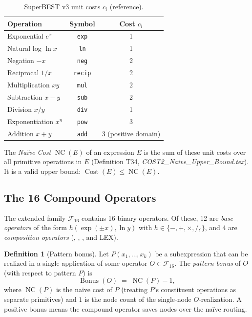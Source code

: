 \documentclass[12pt,a4paper]{article}
\theoremstyle{definition}
\newtheorem{definition}[theorem]{Definition}
\newcommand{\ELAd}{\operatorname{ELAd}}
\newcommand{\ELSb}{\operatorname{ELSb}}
\newcommand{\LEAd}{\operatorname{LEAd}}
\newcommand{\NC}{\operatorname{NC}}
\newcommand{\Cost}{\operatorname{Cost}}
\newcommand{\Bonus}{\operatorname{Bonus}}
\begin{document}
\begin{table}[h]
\centering
\caption{SuperBEST v3 unit costs $c_i$ (reference).}
\label{tab:unit-costs}
\smallskip
\begin{tabular}{@{}lcc@{}}
\toprule
\textbf{Operation} & \textbf{Symbol} & \textbf{Cost $c_i$} \\
\midrule
Exponential  $e^x$   & \texttt{exp} & 1 \\
Natural log  $\ln x$ & \texttt{ln}  & 1 \\
Negation     $-x$    & \texttt{neg} & 2 \\
Reciprocal   $1/x$   & \texttt{recip} & 2 \\
Multiplication $xy$  & \texttt{mul} & 2 \\
Subtraction  $x-y$   & \texttt{sub} & 2 \\
Division     $x/y$   & \texttt{div} & 1 \\
Exponentiation $x^n$ & \texttt{pow} & 3 \\
Addition     $x+y$   & \texttt{add} & 3 (positive domain) \\
\bottomrule
\end{tabular}
\end{table}

The \emph{Na\"{i}ve Cost} $\NC(E)$ of an expression $E$ is the sum of these
unit costs over all primitive operations in $E$ (Definition T34,
\textit{COST2\_Naive\_Upper\_Bound.tex}).  It is a valid upper bound:
$\Cost(E) \leq \NC(E)$.

\subsection{The 16 Compound Operators}

The extended family $\mathcal{F}_{16}$ contains 16 binary operators.
Of these, 12 are \emph{base operators} of the form
$h(\exp(\pm x), \ln y)$ with $h \in \{-,+,\times,/,\hat{}\}$, and 4 are
\emph{composition operators} (\LEAd, \ELAd, \ELSb, and LEX).

\begin{definition}[Pattern bonus]
\label{def:bonus}
Let $P(x_1,\ldots,x_k)$ be a subexpression that can be realized in a single
application of some operator $O \in \mathcal{F}_{16}$.
The \emph{pattern bonus} of $O$ (with respect to pattern $P$) is
\[
  \Bonus(O) \;=\; \NC(P) - 1,
\]
where $\NC(P)$ is the na\"{i}ve cost of $P$ (treating $P$'s constituent
operations as separate primitives) and $1$ is the node count of the
single-node $O$-realization.
A positive bonus means the compound operator saves nodes over the na\"{i}ve
routing.
\end{definition}
\end{document}

